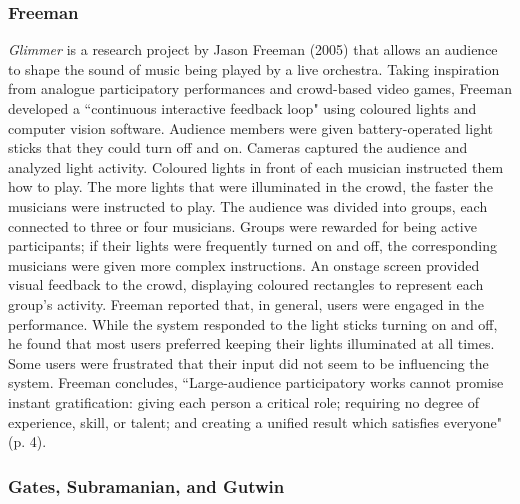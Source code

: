 \subsubsection{Freeman}

\textit{Glimmer} is a research project by Jason Freeman (2005) that allows an audience to shape the sound of music being played by a live orchestra. Taking inspiration from analogue participatory performances and crowd-based video games, Freeman developed a ``continuous interactive feedback loop" using coloured lights and computer vision software. Audience members were given battery-operated light sticks that they could turn off and on. Cameras captured the audience and analyzed light activity. Coloured lights in front of each musician instructed them how to play. The more lights that were illuminated in the crowd, the faster the musicians were instructed to play. The audience was divided into groups, each connected to three or four musicians. Groups were rewarded for being active participants; if their lights were frequently turned on and off, the corresponding musicians were given more complex instructions. An onstage screen provided visual feedback to the crowd, displaying coloured rectangles to represent each group's activity. Freeman reported that, in general, users were engaged in the performance. While the system responded to the light sticks turning on and off, he found that most users preferred keeping their lights illuminated at all times. Some users were frustrated that their input did not seem to be influencing the system. Freeman concludes, ``Large-audience participatory works cannot promise instant gratification: giving each person a critical role; requiring no degree of experience, skill, or talent; and creating a unified result which satisfies everyone" (p. 4).

\subsubsection{Gates, Subramanian, and Gutwin}

